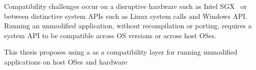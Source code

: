 \placeholder{}


Compatibility challenges
occur on a disruptive hardware such as Intel SGX~\cite{intelsgx}
or between distinctive system APIs
such as Linux system calls and Windows API.
Running an unmodified application, without recompilation or porting,
requires a system API to be
compatible across OS versions or across host OSes.



 






This thesis proposes using a \libos{}
as a compatibility
layer for running unmodified applications on host OSes and hardware








